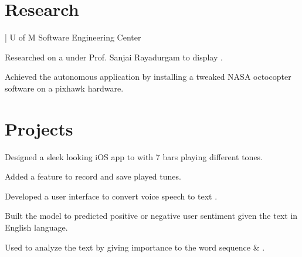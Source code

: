 \documentclass[]{rinkal_resume}
\begin{document}

\section{Research}
 | U of M Software Engineering Center \hfill {}
\vspace{2pt}
\begin{tightemize}
\item Researched on a  under Prof. Sanjai Rayadurgam to display .
\item Achieved the autonomous application by installing a tweaked NASA octocopter software on a pixhawk hardware.
\end{tightemize}
\smallsectionsep

\section{Projects}

 
\vspace{2pt}
\begin{tightemize}
\item Designed a sleek looking iOS app to  with 7 bars playing different tones.
\item Added a feature to record and save played tunes.
\end{tightemize}
\sectionsep

 
\vspace{2pt}
\begin{tightemize}
\item Developed a user interface to convert voice speech to text .
\end{tightemize}
\sectionsep

 
\vspace{2pt}
\begin{tightemize}
\item Built the model to predicted positive or negative user sentiment given the text in English language.
\item Used  to analyze the text by giving importance to the word sequence \& . 
\end{tightemize}
\sectionsep
\end{document}
